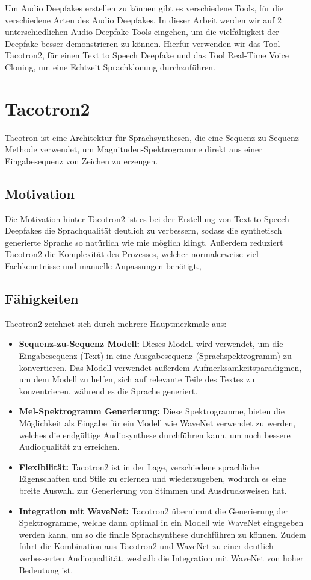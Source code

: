 Um Audio Deepfakes erstellen zu können gibt es verschiedene Tools, für die verschiedene Arten des Audio Deepfakes.
In dieser Arbeit werden wir auf 2 unterschiedlichen Audio Deepfake Tools eingehen, um die vielfältigkeit der Deepfake besser demonstrieren zu können.
Hierfür verwenden wir das Tool Tacotron2, für einen Text to Speech Deepfake und das Tool Real-Time Voice Cloning, um eine Echtzeit Sprachklonung durchzuführen.

\section{Tacotron2}
Tacotron ist eine Architektur für Sprachsynthesen, die eine \gls{Sequenz-zu-Sequenz-Methode} verwendet, um \gls{Magnituden-Spektrogramme} direkt aus einer Eingabesequenz von Zeichen zu erzeugen.

\subsection{Motivation}
Die Motivation hinter Tacotron2 ist es bei der Erstellung von Text-to-Speech Deepfakes die Sprachqualität deutlich zu verbessern, sodass die synthetisch generierte Sprache so natürlich wie mie möglich klingt.
Außerdem reduziert Tacotron2 die Komplexität des Prozesses, welcher normalerweise viel Fachkenntnisse und manuelle Anpassungen benötigt.\cite{Arxiv},\cite{Arxiv2}

\subsection{Fähigkeiten}
Tacotron2 zeichnet sich durch mehrere Hauptmerkmale aus:
\begin{itemize}
    \item \textbf{Sequenz-zu-Sequenz Modell:} Dieses Modell wird verwendet, um die Eingabesequenz (Text) in eine Ausgabesequenz (Sprachspektrogramm) zu konvertieren. Das Modell verwendet außerdem Aufmerksamkeitsparadigmen, um dem Modell zu helfen, sich auf relevante Teile des Textes zu konzentrieren, während es die Sprache generiert.\cite{Arxiv2}
    \item \textbf{Mel-Spektrogramm Generierung:} Diese Spektrogramme, bieten die Möglichkeit als Eingabe für ein Modell wie WaveNet verwendet zu werden, welches die endgültige Audiosynthese durchführen kann, um noch bessere Audioqualität zu erreichen.\cite{Arxiv}
    \item \textbf{Flexibilität:} Tacotron2 ist in der Lage, verschiedene sprachliche Eigenschaften und Stile zu erlernen und wiederzugeben, wodurch es eine breite Auswahl zur Generierung von Stimmen und Ausdrucksweisen hat.\cite{Arxiv}
    \item \textbf{Integration mit WaveNet:} Tacotron2 übernimmt die Generierung der Spektrogramme, welche dann optimal in ein Modell wie WaveNet eingegeben werden kann, um so die finale Sprachsynthese durchführen zu können. Zudem führt die Kombination aus Tacotron2 und WaveNet zu einer deutlich verbesserten Audioqualtität, weshalb die Integration mit WaveNet von hoher Bedeutung ist. \cite{Arxiv}
\end{itemize}

